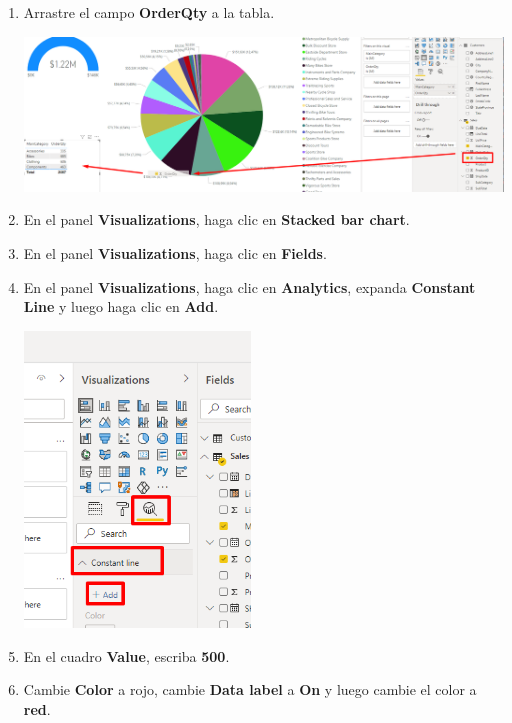 \documentclass[12pt,letterpaper]{article}
\newcommand\tab[1][1cm]{\hspace*{#1}}
\begin{document}
\begin{enumerate}[\tab 1.]
\begin{center}
        \end{center}
        \item Arrastre el campo \textbf{OrderQty} a la tabla.
        \begin{center}
            \includegraphics[width=13cm]{./img/img90.png}
        \end{center}
        \item En el panel \textbf{Visualizations}, haga clic en \textbf{Stacked bar chart}.
        \item En el panel \textbf{Visualizations}, haga clic en \textbf{Fields}.
        \item En el panel \textbf{Visualizations}, haga clic en \textbf{Analytics}, expanda \textbf{Constant Line} y luego haga clic en \textbf{Add}.
        \begin{center}
            \includegraphics[width=6cm]{./img/img94.png}
        \end{center}
        \item En el cuadro \textbf{Value}, escriba \textbf{500}.
        \item Cambie \textbf{Color} a rojo, cambie \textbf{Data label} a \textbf{On} y luego cambie el color a \textbf{red}.
        \begin{center}

\end{center}
\end{enumerate}
\end{document}
